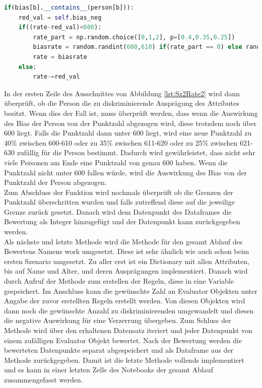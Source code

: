 \begin{onehalfspace}
\begin{lstlisting}[language=Python,label={lst:Sz2Rate2},caption=Codeausschnitt für das Hinzufügen einer Verzerrung beim Bewerten der Personen]
if(bias[b].__contains__(person[b])):
    red_val = self.bias_neg
    if((rate-red_val)<600):
        rate_part = np.random.choice([0,1,2], p=[0.4,0.35,0.25])
        biasrate = random.randint(600,610) if(rate_part == 0) else random.randint(611,620) if(rate_part == 1) else random.randint(621,630)
        rate = biasrate
    else:
        rate-=red_val
\end{lstlisting}
In der ersten Zeile des Ausschnittes von Abbildung \ref{lst:Sz2Rate2} wird dann überprüft, ob die Person die zu diskriminierende Ausprägung des Attributes besitzt. Wenn dies der Fall ist, muss überprüft werden, dass wenn die Auswirkung des Bias der Person von der Punktzahl abgezogen wird, diese trotzdem noch über 600 liegt. Falls die Punktzahl dann unter 600 liegt, wird eine neue Punktzahl zu 40\% zwischen 600-610 oder zu 35\% zwischen 611-620 oder zu 25\% zwischen 621-630 zufällig für die Person bestimmt. Dadurch wird gewährleistet, dass nicht sehr viele Personen am Ende eine Punktzahl von genau 600 haben. Wenn die Punktzahl nicht unter 600 fallen würde, wird die Auswirkung des Bias von der Punktzahl der Person abgezogen.\\
Zum Abschluss der Funktion wird nochmals überprüft ob die Grenzen der Punktzahl überschritten wurden und falls zutreffend diese auf die jeweilige Grenze zurück gesetzt. Danach wird dem Datenpunkt des Dataframes die Bewertung als Integer hinzugefügt und der Datenpunkt kann zurückgegeben werden.\\
Als nächste und letzte Methode wird die Methode für den gesamt Ablauf des Bewertens Namens \glqq{}work\grqq{} umgesetzt. Diese ist sehr ähnlich wie auch schon beim ersten Szenario umgesetzt. Zu aller erst ist ein Dictionary mit allen Attributen, bis auf Name und Alter, und deren Ausprägungen implementiert. Danach wird durch Aufruf der Methode zum erstellen der Regeln, diese in eine Variable gespeichert. Im Anschluss kann die gewünschte Zahl an  \glqq{}Evaluator\grqq{} Objekten unter Angabe der zuvor erstellten Regeln erstellt werden. Von diesen Objekten wird dann noch die gewünschte Anzahl zu diskriminierenden umgewandelt und diesen die negative Auswirkung für eine Verzerrung übergeben. Zum Schluss der Methode wird über den erhaltenen Datensatz iteriert und jeder Datenpunkt von einem zufälligen \glqq{}Evaluator\grqq{} Objekt bewertet. Nach der Bewertung werden die bewerteten Datenpunkte separat abgespeichert und als Dataframe aus der Methode zurückgegeben. Damit ist die letzte Methode vollends implementiert und es kann in einer letzten Zelle des Notebooks der gesamt Ablauf zusammengefasst werden.

\end{onehalfspace}
